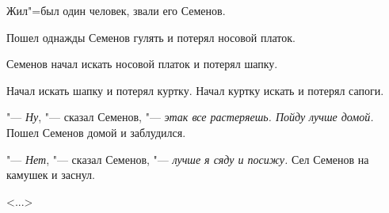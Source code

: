 Жил"=был один человек, звали его Семенов.

Пошел однажды Семенов гулять и потерял носовой платок.

Семенов начал искать носовой платок и потерял шапку.

Начал искать шапку и потерял куртку. Начал куртку искать и потерял сапоги.

"--- \textit{Ну}, "--- сказал Семенов, "--- \textit{этак все растеряешь. Пойду лучше домой.} Пошел Семенов домой и заблудился.

"--- \textit{Нет}, "--- сказал Семенов, "--- \textit{лучше я сяду и посижу.} Сел Семенов на камушек и заснул.

\hfill <...>
